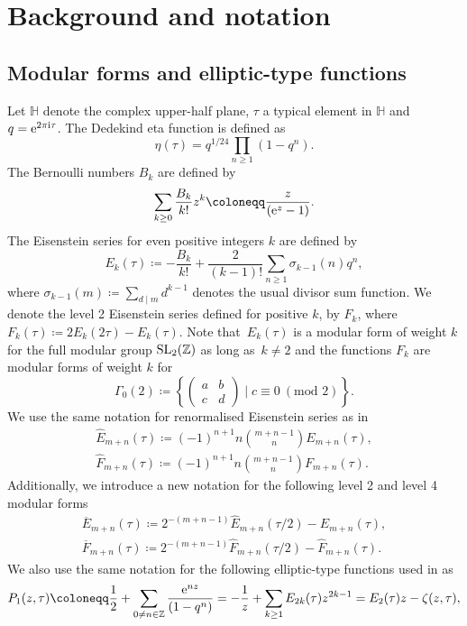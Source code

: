 \documentclass[pdftex]{sigma}
\numberwithin{equation}{section}
\theoremstyle{definition}
\begin{document}
\section{Background and notation}\label{section2}

\subsection{Modular forms and elliptic-type functions}

Let $\mathbb{H}$ denote the complex upper-half plane, $\tau$ a typical element in $\mathbb{H}$ and $q={\rm e}^{2\pi {\rm i} \tau}$. The Dedekind eta function is defined as
\[\eta(\tau)=q^{1/24}\prod_{n\geq 1}(1-q^n).\]
The Bernoulli numbers $B_k$ are defined by
\[\sum_{k\geq 0}\frac{B_k}{k!}z^k\coloneqq \frac{z}{({\rm e}^z-1)}.\]
The Eisenstein series for even positive integers $k$ are defined by
\[E_k(\tau)\coloneqq -\frac{B_k}{k!}+\frac{2}{(k-1)!}\sum_{n\geq 1}\sigma_{k-1}(n)q^n,\]
where $\sigma_{k-1}(m)\coloneqq \sum_{d\mid m}d^{k-1}$ denotes the usual divisor sum function. We denote the level 2 Eisenstein series defined for positive $k$, by $F_k$, where
$F_k(\tau)\coloneqq 2E_k(2\tau)-E_k(\tau)$.
Note that~$E_k(\tau)$ is a modular form of weight $k$ for the full modular group ${\rm SL}_2(\mathbb{Z})$ as long as~${k\neq 2}$ and the functions $F_k$ are modular forms of weight $k$ for
\[\Gamma_0(2) \coloneqq \left\{\begin{pmatrix}
 a & b \\
 c & d
\end{pmatrix}\mid c\equiv 0 \ (\text{mod }2)\right\}.\]
We use the same notation for renormalised Eisenstein series as in \cite{Mason20231-PointAlgebras}
\begin{gather*}
\hat{E}_{m+n}(\tau)\coloneqq (-1)^{n+1}n \binom{m+n-1}{n} E_{m+n}(\tau),\\
\hat{F}_{m+n}(\tau)\coloneqq (-1)^{n+1}n \binom{m+n-1}{n} F_{m+n}(\tau).
\end{gather*}
Additionally, we introduce a new notation for the following level 2 and level 4 modular forms
\begin{gather*}
\overline{E}_{m+n}(\tau)\coloneqq 2^{-(m+n-1)}\hat{E}_{m+n}(\tau/2)-\hat{E}_{m+n}(\tau),\\
\overline{F}_{m+n}(\tau)\coloneqq 2^{-(m+n-1)}\hat{F}_{m+n}(\tau/2)-\hat{F}_{m+n}(\tau).
\end{gather*}
We also use the same notation for the following elliptic-type functions used in \cite{Mason20231-PointAlgebras} as
\begin{equation}\label{eq 7 from MM}
 P_1(z,\tau)\coloneqq \frac{1}{2}+\sum_{0\neq n\in \mathbb{Z}}\frac{{\rm e}^{nz}}{(1-q^n)}=-\frac{1}{z}+\sum_{k\geq 1}E_{2k}(\tau)z^{2k-1}=E_{2}(\tau)z-\zeta(z,\tau),
\end{equation}
\end{document}
